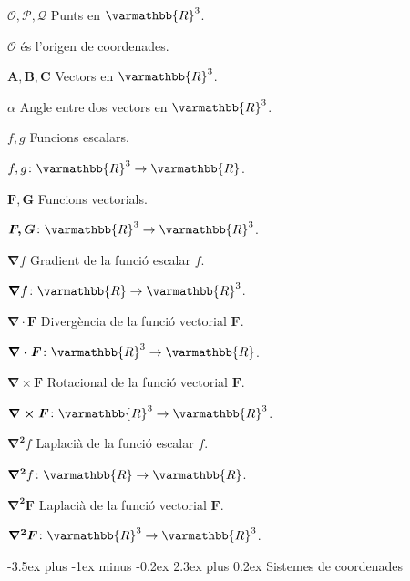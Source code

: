\documentclass[catalan,a4paper,twoside,11pt]{article}
\makeatletter
\renewcommand{\section}{\@startsection {section}{1}{0pt}%
	{-3.5ex plus -1ex minus -0.2ex}%
	{2.3ex plus 0.2ex}%
	{\Large  \sffamily  \bfseries}}
\makeatother
\begin{document}
\begin{list}{}
   \item[$\mathscr{O}, \mathscr{P}, \mathscr{Q}$] Punts en $\varmathbb{R}^3$. 
   
   $\mathscr{O}$ és l'origen de coordenades.

   \item[$\boldsymbol{A,B,C}$] Vectors en $\varmathbb{R}^3$.

   \item[$\alpha$] Angle entre dos vectors en $\varmathbb{R}^3$.

   \item[$f,g$] Funcions escalars.

   $f,g \colon \varmathbb{R}^3\rightarrow\varmathbb{R}$.

   \item[$\boldsymbol{F,G}$] Funcions vectorials.

   $\boldsymbol{F,G}\colon\varmathbb{R}^3\rightarrow\varmathbb{R}^3$.

   \item[$\boldsymbol{\nabla}f$] Gradient de la funció escalar $f$.

   $\boldsymbol{\nabla}f\colon\varmathbb{R}\rightarrow\varmathbb{R}^3$.

   \item[$\boldsymbol{\nabla\cdot F}$] Divergència de la funció vectorial $\boldsymbol{F}$.

   $\boldsymbol{\nabla\cdot F}\colon \varmathbb{R}^3\rightarrow\varmathbb{R}$.

   \item[$\boldsymbol{\nabla\times F}$] Rotacional de la funció vectorial $\boldsymbol{F}$.

   $\boldsymbol{\nabla\times F}\colon   \varmathbb{R}^3\rightarrow\varmathbb{R}^3$.

   \item[$\boldsymbol{\nabla^2}f$] Laplacià de la funció escalar $f$.

   $\boldsymbol{\nabla^2}f\colon \varmathbb{R}\rightarrow\varmathbb{R}$.

   \item[$\boldsymbol{\nabla^2F}$] Laplacià de la funció vectorial $\boldsymbol{F}$.

    $\boldsymbol{\nabla^2F}\colon \varmathbb{R}^3\rightarrow\varmathbb{R}^3$.
\end{list}


\section{Sistemes de coordenades}
\end{document}
